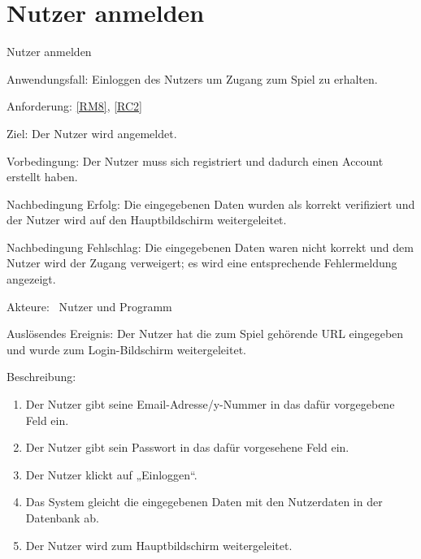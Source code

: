 \section{Nutzer anmelden}
\begin{function}{20}{Nutzer anmelden}
\item[Anwendungsfall:] Einloggen des Nutzers um Zugang zum Spiel zu erhalten.
\item[Anforderung:] \ref{RM8}, \ref{RC2}
\item[Ziel:] Der Nutzer wird angemeldet.
\item[Vorbedingung:] Der Nutzer muss sich registriert und dadurch einen Account erstellt haben.
\item[Nachbedingung Erfolg:]  Die eingegebenen Daten wurden als korrekt verifiziert und der Nutzer wird auf den Hauptbildschirm weitergeleitet.
\item[Nachbedingung Fehlschlag:] Die eingegebenen Daten waren nicht korrekt und dem Nutzer wird der Zugang verweigert; es wird eine entsprechende Fehlermeldung angezeigt.
\item[Akteure:] ~Nutzer und Programm
\item[Auslösendes Ereignis:] Der Nutzer hat die zum Spiel gehörende URL eingegeben und wurde zum Login-Bildschirm weitergeleitet.
\item[Beschreibung:] ~
\begin{enumerate}
  \item  Der Nutzer gibt seine Email-Adresse/y-Nummer in das dafür vorgegebene Feld ein.
  \item  Der Nutzer gibt sein Passwort in das dafür vorgesehene Feld ein.
  \item Der Nutzer klickt auf „Einloggen“.
  \item  Das System gleicht die eingegebenen Daten mit den Nutzerdaten in der Datenbank ab.
  \item Der Nutzer wird zum Hauptbildschirm weitergeleitet.
\end{enumerate}
\end{function}

